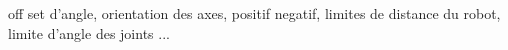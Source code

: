 off set d'angle, orientation des axes, positif negatif, limites de distance du robot, limite d'angle des joints ...